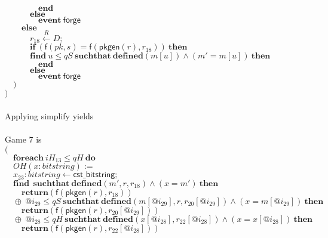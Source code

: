 \documentclass{article}
\newcommand{\store}{\leftarrow}
\newcommand{\getR}{\stackrel{R}{\store}}
\newcommand{\kw}[1]{\mathbf{#1}}
\newcommand{\kwf}[1]{\mathsf{#1}}
\newcommand{\var}[1]{\mathit{#1}}
\newcommand{\kwt}[1]{\mathit{#1}}
\newcommand{\kwp}[1]{\mathit{#1}}
\begin{document}
\begin{tabbing}
$\quad \quad \quad \quad \kw{end}$\\
$\quad \quad \quad \kw{else}$\\
$\quad \quad \quad \quad \kw{event}\ \kwf{forge}$\\
$\quad \quad \kw{else}$\\
$\quad \quad \quad \var{r}_{18} \getR \kwt{D};$\\
$\quad \quad \quad \kw{if}\ (\kwf{f}(\var{pk}, \var{s})  =  \kwf{f}(\kwf{pkgen}(\var{r}), \var{r}_{18}))\ \kw{then}$\\
$\quad \quad \quad \kw{find}\ \var{u} \leq \kwp{qS}\ \kw{suchthat}\ \kw{defined}(\var{m}[\var{u}])\wedge (\var{m'}  =  \var{m}[\var{u}])\ \kw{then}$\\
$\quad \quad \quad \quad \kw{end}$\\
$\quad \quad \quad \kw{else}$\\
$\quad \quad \quad \quad \kw{event}\ \kwf{forge}$\\
$\quad )$\\
$)$\\
$ $\\
\\
Applying simplify yields\\
\\
Game 7 is\\
$($\\
$\quad \kw{foreach}\ \var{iH}_{13} \leq \kwp{qH}\ \kw{do}$\\
$\quad OH(\var{x}: \kwt{bitstring}) :=$\\
$\quad \var{x}_{23}: \kwt{bitstring} \store \kwf{cst\_bitstring};$\\
$\quad \kw{find}\ \ \kw{suchthat}\ \kw{defined}(\var{m'}, \var{r}, \var{r}_{18})\wedge (\var{x}  =  \var{m'})\ \kw{then}$\\
$\quad \quad \kw{return}\kwf{}(\kwf{f}(\kwf{pkgen}(\var{r}), \var{r}_{18}))$\\
$\quad \oplus\ \var{@i}_{29} \leq \kwp{qS}\ \kw{suchthat}\ \kw{defined}(\var{m}[\var{@i}_{29}], \var{r}, \var{r}_{20}[\var{@i}_{29}])\wedge (\var{x}  =  \var{m}[\var{@i}_{29}])\ \kw{then}$\\
$\quad \quad \kw{return}\kwf{}(\kwf{f}(\kwf{pkgen}(\var{r}), \var{r}_{20}[\var{@i}_{29}]))$\\
$\quad \oplus\ \var{@i}_{28} \leq \kwp{qH}\ \kw{suchthat}\ \kw{defined}(\var{x}[\var{@i}_{28}], \var{r}_{22}[\var{@i}_{28}])\wedge (\var{x}  =  \var{x}[\var{@i}_{28}])\ \kw{then}$\\
$\quad \quad \kw{return}\kwf{}(\kwf{f}(\kwf{pkgen}(\var{r}), \var{r}_{22}[\var{@i}_{28}]))$\\

\end{tabbing}
\end{document}
